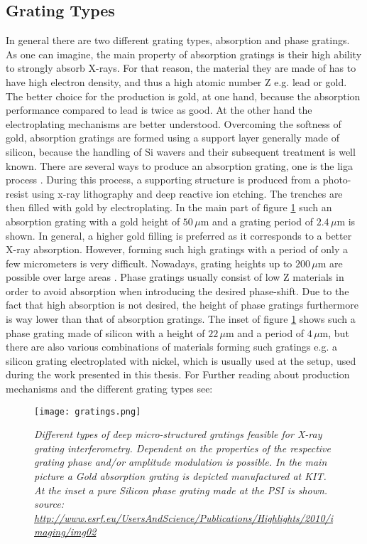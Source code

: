 \subsection{Grating Types} \label{subsec: gt}
In general there are two different grating types, absorption and phase gratings. As one can imagine, the main property of absorption gratings is their high ability to strongly absorb X-rays. For that reason, the material they are made of has to have high electron density, and thus a high atomic number Z e.g. lead or gold. The better choice for the production is gold, at one hand, because the absorption performance compared to lead is twice as good. At the other hand the electroplating mechanisms are better understood. Overcoming the softness of gold, absorption gratings are formed using a support layer generally made of silicon, because the handling of Si wavers and their subsequent treatment is well known. There are several ways to produce an absorption grating, one is the \gls{liga} process \citep{Qin2015}. During this process, a supporting structure is produced from a photo-resist using x-ray lithography and deep reactive ion etching. The trenches are then filled with gold by electroplating.
In the main part of figure \ref{gratings} such an absorption grating with a gold height of $50\, \mu$m and a grating period of $2.4\, \mu$m is shown. In general, a higher gold filling is preferred as it corresponds to a better X-ray absorption. However, forming such high gratings with a period of only a few micrometers is very difficult. Nowadays, grating heights up to $ 200\, \mu$m are possible over large areas \citep{Qin2015}. Phase gratings usually consist of low Z materials in order to avoid absorption when introducing the desired phase-shift. Due to the fact that high absorption is not desired, the height of phase gratings furthermore is way lower than that of absorption gratings. The inset of figure \ref{gratings} shows such a phase grating made of silicon with a height of $22\, \mu$m and a period of $4\, \mu$m, but there are also various combinations of materials forming such gratings e.g. a silicon grating electroplated with nickel, which is usually used at the setup, used during the work presented in this thesis. For Further reading about production mechanisms and the different grating types see: \citep{Lei2014,Mohraspect}     
\begin{figure}[t]
	\begin{center}
		\texttt{[image: gratings.png]}
	\end{center}
	\caption[Different types of deep micro-structured gratings feasible for X-ray interferometry]{\textit{Different types of deep micro-structured gratings feasible for X-ray grating interferometry. Dependent on the properties of the respective grating phase and/or amplitude modulation is possible. In the main picture a Gold absorption grating is depicted manufactured at KIT. At the inset a pure Silicon phase grating made at the PSI is shown. source: \url{http://www.esrf.eu/UsersAndScience/Publications/Highlights/2010/imaging/img02}}}
	\label{gratings}
\end{figure}  

